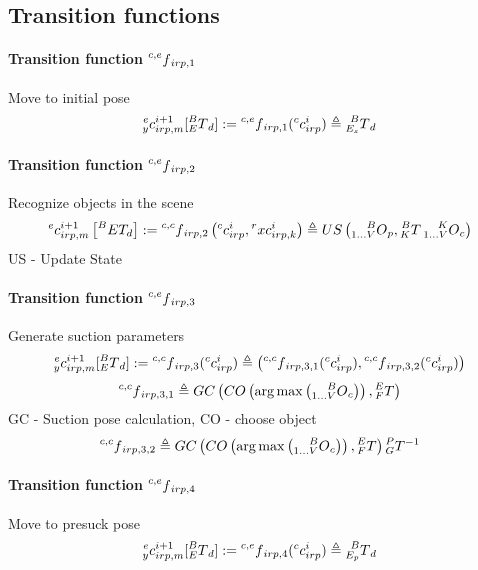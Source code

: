 \documentclass[12pt]{article}
\begin{document}
	\subsection{Transition functions}
		\paragraph{Transition function $\prescript{c,e}{}f_{irp, 1}$}
		Move to initial pose
			\[ \prescript{e}{y}c_{irp, m}^{i + 1} \lbrack \prescript{B}{E}T_d \rbrack := \prescript{c, e}{}{f}_{irp, 1} (\prescript{c}{}c_{irp}^i) \triangleq \prescript{B}{E_s}T_d \]
		
		\paragraph{Transition function $\prescript{c,e}{}f_{irp, 2}$}
		Recognize objects in the scene
\[
\prescript{e}{}{c}_{irp, m}^{i + 1} \left[ \prescript{B}{}{E}T_d \right] := \prescript{c, c}{}{f}_{irp ,2}\left(\prescript{c}{}{c}_{irp}^i, \prescript{r}{}{x}c_{irp, k}^i \right) \triangleq US\left(\prescript{B}{1\dots V}O_p, \prescript{B}{K}T \prescript{K}{1\dots V}O_c \right)
\]
	US - Update State	
		\paragraph{Transition function $\prescript{c,e}{}f_{irp, 3}$}
		Generate suction parameters
			\[ \prescript{e}{y}c_{irp, m}^{i + 1} \lbrack \prescript{B}{E}T_d \rbrack := \prescript{c,c}{}f_{irp, 3}(\prescript{c}{}c_{irp}^i) \triangleq \left( \prescript{c, c}{}f_{irp, 3, 1} (\prescript{c}{}c_{irp}^i), \prescript{c, c}{}f_{irp, 3, 2} (\prescript{c}{}c_{irp}^i) \right) \]
			\[
\prescript{c, c}{}f_{irp, 3, 1} \triangleq GC \left( CO \left( \arg\max \left( \prescript{B}{1\dots V}O_c \right) \right), \prescript{E}{F}T \right)
\]
GC - Suction pose calculation, CO - choose object
			\[
\prescript{c, c}{}f_{irp, 3, 2} \triangleq GC\left(CO\left(\arg\max \left( \prescript{B}{1\dots V}O_c \right)\right), \prescript{E}{F}T\right) \prescript{P}{G}T^{-1}
\]
		
		\paragraph{Transition function $\prescript{c,e}{}f_{irp, 4}$}
		Move to presuck pose
			\[ \prescript{e}{y}c_{irp, m}^{i + 1} \lbrack \prescript{B}{E}T_d \rbrack := \prescript{c, e}{}f_{irp, 4}(\prescript{c}{}c_{irp}^i) \triangleq \prescript{B}{E_p}T_d \]
		
\end{document}

